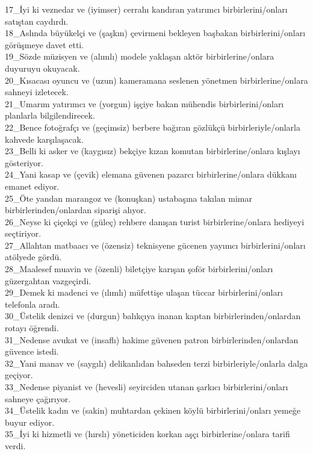 \begin{myparindent}{0pt}
17\_İyi ki veznedar ve (iyimser) cerrahı kandıran yatırımcı birbirlerini/onları satıştan caydırdı. \\
18\_Aslında büyükelçi ve (şaşkın) çevirmeni bekleyen başbakan birbirlerini/onları görüşmeye davet etti. \\
19\_Sözde müzisyen ve (alımlı) modele yaklaşan aktör birbirlerine/onlara duyuruyu okuyacak. \\
20\_Kısacası oyuncu ve (uzun) kameramana seslenen yönetmen birbirlerine/onlara sahneyi izletecek. \\
21\_Umarım yatırımcı ve (yorgun) işçiye bakan mühendis birbirlerini/onları planlarla bilgilendirecek. \\
22\_Bence fotoğrafçı ve (geçimsiz) berbere bağıran gözlükçü birbirleriyle/onlarla kahvede karşılaşacak. \\
23\_Belli ki asker ve (kaygısız) bekçiye kızan komutan birbirlerine/onlara kışlayı gösteriyor. \\
24\_Yani kasap ve (çevik) elemana güvenen pazarcı birbirlerine/onlara dükkanı emanet ediyor. \\
25\_Öte yandan marangoz ve (konuşkan) ustabaşına takılan mimar birbirlerinden/onlardan siparişi alıyor. \\
26\_Neyse ki çiçekçi ve (güleç) rehbere danışan turist birbirlerine/onlara hediyeyi seçtiriyor. \\
27\_Allahtan matbaacı ve (özensiz) teknisyene gücenen yayımcı birbirlerini/onları atölyede gördü. \\
28\_Maalesef muavin ve (özenli) biletçiye karışan şoför birbirlerini/onları güzergahtan vazgeçirdi. \\
29\_Demek ki madenci ve (ılımlı) müfettişe ulaşan tüccar birbirlerini/onları telefonla aradı. \\
30\_Üstelik denizci ve (durgun) balıkçıya inanan kaptan birbirlerinden/onlardan rotayı öğrendi. \\
31\_Nedense avukat ve (insaflı) hakime güvenen patron birbirlerinden/onlardan güvence istedi. \\
32\_Yani manav ve (saygılı) delikanlıdan bahseden terzi birbirleriyle/onlarla dalga geçiyor. \\
33\_Nedense piyanist ve (hevesli) seyirciden utanan şarkıcı birbirlerini/onları sahneye çağırıyor. \\
34\_Üstelik kadın ve (sakin) muhtardan çekinen köylü birbirlerini/onları yemeğe buyur ediyor. \\
35\_İyi ki hizmetli ve (hırslı) yöneticiden korkan aşçı birbirlerine/onlara tarifi verdi. \\

\end{myparindent}
